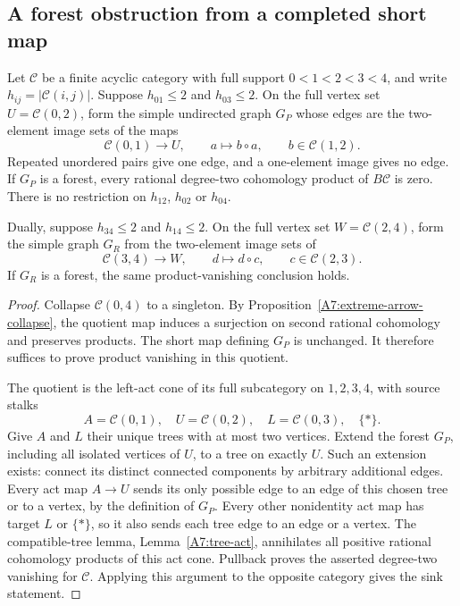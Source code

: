 \subsection{A forest obstruction from a completed short map}

\begin{proposition}
\label{A7:short-map-forest}
Let $\mathcal C$ be a finite acyclic category with full support
$0<1<2<3<4$, and write $h_{ij}=|\mathcal C(i,j)|$.
Suppose $h_{01}\leq2$ and $h_{03}\leq2$.
On the full vertex set $U=\mathcal C(0,2)$, form the simple
undirected graph $G_P$ whose edges are the two-element image
sets of the maps
\[
 \mathcal C(0,1)\longrightarrow U,\qquad a\longmapsto b\circ a,
 \qquad b\in\mathcal C(1,2).
\]
Repeated unordered pairs give one edge, and a one-element image
gives no edge. If $G_P$ is a forest, every rational degree-two
cohomology product of $B\mathcal C$ is zero.
There is no restriction on $h_{12}$, $h_{02}$ or $h_{04}$.

Dually, suppose $h_{34}\leq2$ and $h_{14}\leq2$.
On the full vertex set $W=\mathcal C(2,4)$, form the simple
graph $G_R$ from the two-element image sets of
\[
 \mathcal C(3,4)\longrightarrow W,\qquad d\longmapsto d\circ c,
 \qquad c\in\mathcal C(2,3).
\]
If $G_R$ is a forest, the same product-vanishing conclusion holds.
\end{proposition}
\begin{proof}
Collapse $\mathcal C(0,4)$ to a singleton. By
Proposition~\ref{A7:extreme-arrow-collapse}, the quotient map
induces a surjection on second rational cohomology and preserves
products. The short map defining $G_P$ is unchanged. It therefore
suffices to prove product vanishing in this quotient.

The quotient is the left-act cone of its full subcategory on
$1,2,3,4$, with source stalks
\[
 A=\mathcal C(0,1),\quad U=\mathcal C(0,2),\quad
 L=\mathcal C(0,3),\quad \{*\}.
\]
Give $A$ and $L$ their unique trees with at most two vertices.
Extend the forest $G_P$, including all isolated vertices of $U$,
to a tree on exactly $U$. Such an extension exists: connect its
distinct connected components by arbitrary additional edges.
Every act map $A\to U$ sends its only possible edge to an edge
of this chosen tree or to a vertex, by the definition of $G_P$.
Every other nonidentity act map has target $L$ or $\{*\}$, so
it also sends each tree edge to an edge or a vertex.
The compatible-tree lemma, Lemma~\ref{A7:tree-act}, annihilates
all positive rational cohomology products of this act cone.
Pullback proves the asserted degree-two vanishing for
$\mathcal C$. Applying this argument to the opposite category
gives the sink statement.
\end{proof}

